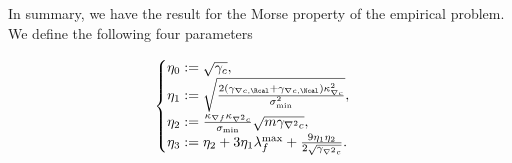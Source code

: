 %

In summary, we have the result for the Morse property of the empirical problem. We define the following four parameters

\[
\begin{cases}
	\eta_0:=\sqrt{ \gamma_c} ,\\
	\eta_1:=\sqrt{\frac{2(\gamma_{\nabla c, \Rcal}+\gamma_{\nabla c, \Ncal})\kappa_{\nabla c}^2}{\sigma_{\min}^2} },\\
	\eta_2:=\tfrac{\kappa_{\nabla f}\kappa_{\nabla^2 c}}{\sigma_{\min}}\sqrt{m\gamma_{\nabla^2 c}},\\
	\eta_3:=\eta_2 +3\eta_1 \lambda_f^{\max}+\frac{9\eta_1\eta_2}{2\sqrt{\gamma_{\nabla^2 c}}}.
\end{cases}
\]

